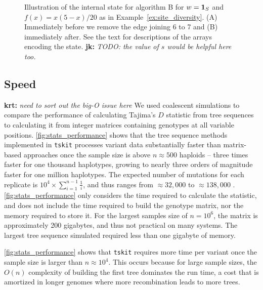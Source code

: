 \documentclass{article}
\newcommand{\iw}{w} %
\newcommand{\jk}[1]{{\color{red}\textbf{jk:} \it #1}}
\newcommand{\krt}[1]{{\color{green}\textbf{krt:} \it #1}}
\begin{document}
\begin{figure}
    \caption{
    Illustration of the internal state for algorithm B for $\iw = \bone_S$ and
    $f(x) = x(5 - x) / 20$ as in Example~\ref{ex:site_diversity}. (A)
    Immediately before we remove the edge joining 6 to 7 and (B) immediately after.
    See the text for descriptions of the arrays encoding the state.
    \jk{TODO: the value of $s$ would be helpful here too.}
    \label{fig:algorithm_example}}
\end{figure}

\subsection*{Speed}

\krt{need to sort out the big-O issue here}
We used coalescent simulations to compare the performance of calculating Tajima's \citeyearpar{Tajima1989-de} $D$
statistic from tree sequences to calculating it from integer matrices containing genotypes at all variable positions.
\autoref{fig:stats_performance} shows that the tree sequence methods implemented in \texttt{tskit} processes variant data
substantially faster than matrix-based approaches once the sample size is above $n \approx 500$ haploids --
three times faster for one thousand haplotypes,
growing to nearly three orders of magnitude faster for one million haplotypes.
The expected number of mutations for each replicate is $10^4 \times \sum_{i=1}^{n-1}\frac{1}{i}$, and thus ranges from
$\approx 32,000$ to $\approx 138,000$ \citep{Watterson1975-ej}.
\autoref{fig:stats_performance} only considers the time required to calculate the statistic,
and does not include the time required to build the genotype matrix, nor the memory required to store it.
For the largest samples size of $n=10^6$,
the matrix is approximately 200 gigabytes, and thus not practical on many systems.
The largest tree sequence simulated required less than one gigabyte of memory.

\autoref{fig:stats_performance} shows that \texttt{tskit} requires more time per variant once the sample size is larger
than $n \approx 10^4$.
This occurs because for large sample sizes,
the $O(n)$ complexity of building the first tree dominates the run time,
a cost that is amortized in longer genomes where more recombination leads to more trees.
\end{document}
